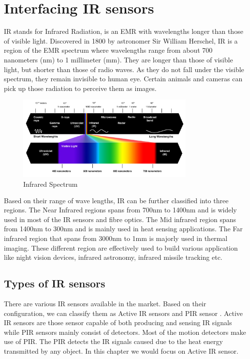 \chapter{Interfacing IR sensors}
\label{ch:ir-sensors}

\ac{IR} stands for Infrared Radiation, is an \ac{EMR} with wavelengths longer than those of visible light. Discovered in 1800 by astronomer Sir William Herschel, \ac{IR} is a region of the \ac{EMR} spectrum where wavelengths range from about 700 nanometers (nm) to 1 millimeter (mm). They are longer than those of visible light, but shorter than those of radio waves. As they do not fall under the visible spectrum, they remain invisible to human eye. Certain animals and cameras can pick up those radiation to perceive them as images.

\begin{figure}
    \centering
	\includegraphics[width=3.5in]{Images/IR Sensor/IR_spectrum.jpg}
	\caption{Infrared Spectrum}
\end{figure}

Based on their range of wave lengths, \ac{IR} can be further classified into three regions. The Near Infrared regions spans from 700nm to 1400nm and is widely used in most of the \ac{IR} sensors and fibre optics. The Mid infrared region spans from 1400nm to 300nm and is mainly used in heat sensing applications. The Far infrared region that spans from 3000nm to 1mm is majorly used in thermal imaging. These different region are effectively used to build various application like night vision devices, infrared astronomy, infrared missile tracking etc.


\section{Types of \ac{IR} sensors}
\par There are various \ac{IR} sensors available in the market. Based on their configuration, we can classify them as Active \ac{IR} sensors and \ac{PIR} sensor . Active \ac{IR} sensors are those sensor capable of both producing and sensing \ac{IR} signals while \ac{PIR} sensors mainly consist of detectors. Most of the motion detectors make use of \ac{PIR}. The \ac{PIR} detects the \ac{IR} signals caused due to the heat energy transmitted by any object. In this chapter we would focus on Active \ac{IR} sensor.

